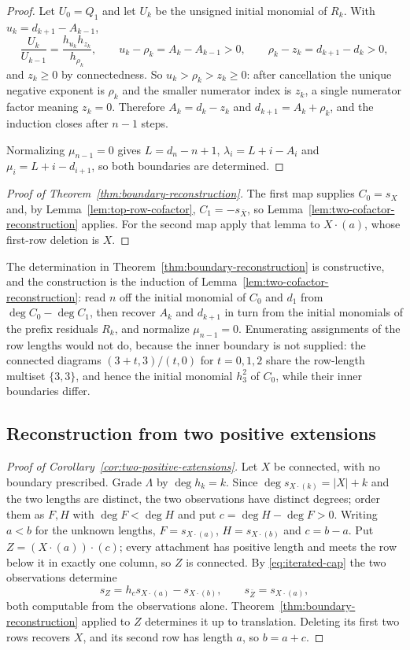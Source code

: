 \documentclass[11pt,a4paper]{amsart}
\numberwithin{equation}{section}
\theoremstyle{plain}
\theoremstyle{definition}
\newcommand{\Lam}{\Lambda}
\begin{document}
\begin{proof}
Let \(U_0=Q_1\) and let \(U_k\) be the unsigned initial monomial of \(R_k\).  With \(u_k=d_{k+1}-A_{k-1}\),
\[
\frac{U_k}{U_{k-1}}=\frac{h_{u_k}h_{z_k}}{h_{\rho_k}},
\qquad
u_k-\rho_k=A_k-A_{k-1}>0,
\qquad
\rho_k-z_k=d_{k+1}-d_k>0,
\]
and \(z_k\ge0\) by connectedness.  So \(u_k>\rho_k>z_k\ge0\): after cancellation the unique negative exponent is \(\rho_k\) and the smaller numerator index is \(z_k\), a single numerator factor meaning \(z_k=0\).  Therefore \(A_k=d_k-z_k\) and \(d_{k+1}=A_k+\rho_k\), and the induction closes after \(n-1\) steps.

Normalizing \(\mu_{n-1}=0\) gives \(L=d_n-n+1\), \(\lambda_i=L+i-A_i\) and \(\mu_i=L+i-d_{i+1}\), so both boundaries are determined.
\end{proof}

\begin{proof}[Proof of Theorem~\ref{thm:boundary-reconstruction}]
The first map supplies \(C_0=s_X\) and, by Lemma~\ref{lem:top-row-cofactor}, \(C_1=-s_{\bar X}\), so Lemma~\ref{lem:two-cofactor-reconstruction} applies.  For the second map apply that lemma to \(X\cdot(a)\), whose first-row deletion is \(X\).
\end{proof}

The determination in Theorem~\ref{thm:boundary-reconstruction} is constructive, and the construction is the induction of Lemma~\ref{lem:two-cofactor-reconstruction}: read \(n\) off the initial monomial of \(C_0\) and \(d_1\) from \(\deg C_0-\deg C_1\), then recover \(A_k\) and \(d_{k+1}\) in turn from the initial monomials of the prefix residuals \(R_k\), and normalize \(\mu_{n-1}=0\).  Enumerating assignments of the row lengths would not do, because the inner boundary is not supplied: the connected diagrams \((3+t,3)/(t,0)\) for \(t=0,1,2\) share the row-length multiset \(\{3,3\}\), and hence the initial monomial \(h_3^2\) of \(C_0\), while their inner boundaries differ.

\subsection{Reconstruction from two positive extensions}\label{subsec:two-positive-extensions}

\begin{proof}[Proof of Corollary~\ref{cor:two-positive-extensions}]
Let \(X\) be connected, with no boundary prescribed.  Grade \(\Lam\) by \(\deg h_k=k\).  Since \(\deg s_{X\cdot(k)}=|X|+k\) and the two lengths are distinct, the two observations have distinct degrees; order them as \(F,H\) with \(\deg F<\deg H\) and put \(c=\deg H-\deg F>0\).  Writing \(a<b\) for the unknown lengths, \(F=s_{X\cdot(a)}\), \(H=s_{X\cdot(b)}\) and \(c=b-a\).  Put \(Z=(X\cdot(a))\cdot(c)\); every attachment has positive length and meets the row below it in exactly one column, so \(Z\) is connected.  By \eqref{eq:iterated-cap} the two observations determine
\[
s_Z=h_cs_{X\cdot(a)}-s_{X\cdot(b)},
\qquad
s_{\bar Z}=s_{X\cdot(a)},
\]
both computable from the observations alone.  Theorem~\ref{thm:boundary-reconstruction} applied to \(Z\) determines it up to translation.  Deleting its first two rows recovers \(X\), and its second row has length \(a\), so \(b=a+c\).
\end{proof}
\end{document}
